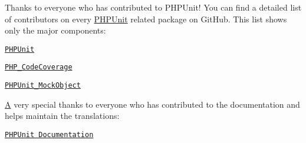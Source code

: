 Thanks to everyone who has contributed to P\+H\+P\+Unit! You can find a detailed list of contributors on every \mbox{\hyperlink{namespace_p_h_p_unit}{P\+H\+P\+Unit}} related package on Git\+Hub. This list shows only the major components\+:


\begin{DoxyItemize}
\item \href{https://github.com/sebastianbergmann/phpunit/graphs/contributors}{\tt P\+H\+P\+Unit}
\item \href{https://github.com/sebastianbergmann/php-code-coverage/graphs/contributors}{\tt P\+H\+P\+\_\+\+Code\+Coverage}
\item \href{https://github.com/sebastianbergmann/phpunit-mock-objects/graphs/contributors}{\tt P\+H\+P\+Unit\+\_\+\+Mock\+Object}
\end{DoxyItemize}

\mbox{\hyperlink{class_a}{A}} very special thanks to everyone who has contributed to the documentation and helps maintain the translations\+:


\begin{DoxyItemize}
\item \href{https://github.com/sebastianbergmann/phpunit-documentation/graphs/contributors}{\tt P\+H\+P\+Unit Documentation} 
\end{DoxyItemize}